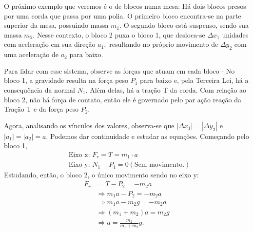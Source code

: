 \documentclass[physics_notes.tex]{subfiles}
\begin{document}
\begin{example}
	O próximo exemplo que veremos é o de blocos numa mesa: Há dois blocos presos por uma corda que passa por uma polia.
	O primeiro bloco encontra-se na parte superior da mesa, possuindo massa $m_{1}$. O segundo bloco está suspenso, sendo
	sua massa $m_{2}.$ Nesse contexto, o bloco 2 puxa o bloco 1, que desloca-se $\Delta x_{1}$ unidades com aceleração em sua direção
	$a_{1},$ resultando no próprio movimento de $\Delta y_{2}$ com uma aceleração de $a_{2}$ para baixo.

	Para lidar com esse sistema, observe as forças que atuam em cada bloco - No bloco 1, a gravidade resulta na força
	peso $P_{1}$ para baixo e, pela Terceira Lei, há a consequência da normal $N_{1}.$ Além delas, há a tração T da corda.
	Com relação ao bloco 2, não há força de contato, então ele é governado pelo par ação reação da Tração T e da força
	peso $P_{2}.$

	Agora, analisando os vínculos dos valores, observa-se que $|\Delta x_{1}|=|\Delta y_{2}|$ e $|a_{1}| = |a_{2}| = a.$
	Podemos dar continuidade e estudar as equações. Começando pelo bloco 1,
	\begin{align*}
		 & \text{Eixo x: } F_{r} = T = m_{1}\cdot a                  \\
		 & \text{Eixo y: } N_{1} - P_{1} = 0 (\text{Sem movimento.})
	\end{align*}
	Estudando, então, o bloco 2, o único movimento sendo no eixo y:
	\begin{align*}
		F_{r} & = T - P_{2} = -m_{2}a                       \\
		      & \Rightarrow m_{1}a - P_{2} = -m_{2}a        \\
		      & \Rightarrow m_{1}a - m_{2}g = -m_{2}a       \\
		      & \Rightarrow (m_{1}+m_{2})a = m_{2}g         \\
		      & \Rightarrow a = \frac{m_{2}}{m_{1}+m_{2}}g.
	\end{align*}

\end{example}
\end{document}
